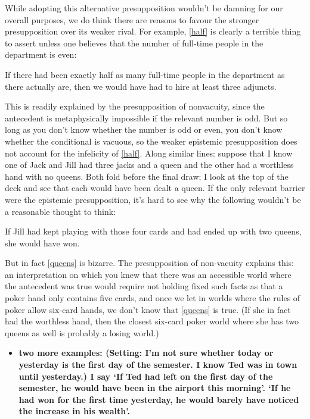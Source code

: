 \documentclass[If.tex]{subfiles}
\begin{document}
While adopting this alternative presupposition wouldn't be damning for our overall purposes, we do think there are reasons to favour the stronger presupposition over its weaker rival. For example, \ref{half} is clearly a terrible thing to assert unless one believes that the number of full-time people in the department is even:
\begin{prop}
	\nitem \label{half}
		If there had been exactly half as many full-time people in the department as there actually are, then we would have had to hire at least three adjuncts.
\end{prop}
This is readily explained by the presupposition of nonvacuity, since the antecedent is metaphysically impossible if the relevant number is odd. But so long as you don't know whether the number is odd or even, you don't know whether the conditional is vacuous, so the weaker epistemic presupposition does not account for the infelicity of \ref{half}. Along similar lines: suppose that I know one of Jack and Jill had three jacks and a queen and the other had a worthless hand with no queens. Both fold before the final draw; I look at the top of the deck and see that each would have been dealt a queen. If the only relevant barrier were the epistemic presupposition, it's hard to see why the following wouldn't be a reasonable thought to think:
\begin{prop}
	\nitem \label{queens}
		If Jill had kept playing with those four cards and had ended up with two queens, she would have won.
\end{prop}
But in fact \ref{queens} is bizarre. The presupposition of non-vacuity explains this: an interpretation on which you knew that there was an accessible world where the antecedent was true would require not holding fixed such facts as that a poker hand only contains five cards, and once we let in worlds where the rules of poker allow six-card hands, we don't know that \ref{queens} is true. (If she in fact had the worthless hand, then the closest six-card poker world where she has two queens as well is probably a losing world.)

\begin{itemize} 
	\item
	\textbf{two more examples: (Setting: I'm not sure whether today or yesterday is the first day of the semester. I know Ted was in town until yesterday.) I say ‘If Ted had left on the first day of the semester, he would have been in the airport this morning’. ‘If he had won for the first time yesterday, he would barely have noticed the increase in his wealth’.} 
\end{itemize}
\end{document}

